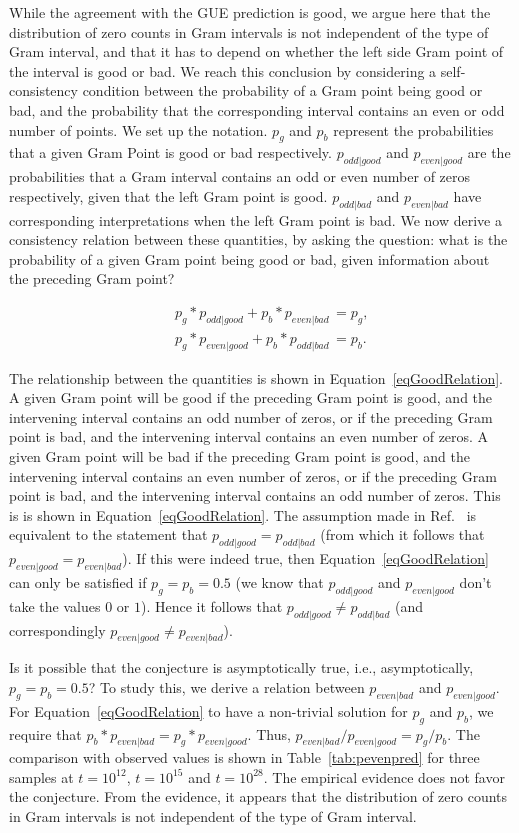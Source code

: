 \documentclass[twoside]{article}
\theoremstyle{definition}
\begin{document}
While the agreement with the GUE prediction is good, we argue here that the distribution of zero counts in Gram intervals is not independent of the type of Gram interval, and that it has to depend on whether the left side Gram point of the interval is good or bad. We reach this conclusion by considering a self-consistency condition between the probability of a Gram point being good or bad, and the probability that the corresponding interval contains an even or odd number of points.  We set up the notation. $p_g$ and $p_b$ represent the probabilities that a given Gram Point is good or bad respectively.  $p_{odd|good}$ and $p_{even|good}$ are the probabilities that a Gram interval contains an odd or even number of zeros respectively, given that the left Gram point is good. $p_{odd|bad}$ and $p_{even|bad}$ have corresponding interpretations when the left Gram point is bad. We now derive a consistency relation between these quantities, by asking the question: what is the probability of a given Gram point being good or bad, given information about the preceding Gram point? 

\begin{eqnarray}
&&p_g*p_{odd|good}  + p_b*p_{even|bad}\, =  p_g,\nonumber\\
&&p_g*p_{even|good} + p_b*p_{odd|bad}\, = p_b.
\label{eqGoodRelation}
\end{eqnarray}

The relationship between the quantities is shown in Equation~\ref{eqGoodRelation}. A given Gram point will be good if the preceding Gram point is good, and the intervening interval contains an odd number of zeros, or if the preceding Gram point is bad, and the intervening interval contains an even number of zeros. A given Gram point will be bad if the preceding Gram point is good, and the intervening interval contains an even number of zeros, or if the preceding Gram point is bad, and the intervening interval contains an odd number of zeros. This is is shown in Equation~\ref{eqGoodRelation}. The assumption made in Ref.~\cite{Odlyzko 1992} is equivalent to the statement that $p_{odd|good} = p_{odd|bad}$ (from which it follows that  $p_{even|good} = p_{even|bad}$). If this were indeed true, then Equation~\ref{eqGoodRelation} can only be satisfied if $p_g = p_b = 0.5$ (we know that $p_{odd|good}$ and $p_{even|good}$ don't take the values $0$ or $1$). Hence it follows that $p_{odd|good} \neq p_{odd|bad}$ (and correspondingly $p_{even|good} \neq p_{even|bad}$). 

Is it possible that the conjecture is asymptotically true, i.e., asymptotically, $p_g = p_b = 0.5$? To study this, we derive a relation between $p_{even|bad}$ and $p_{even|good}$. For Equation~\ref{eqGoodRelation} to have a non-trivial solution for $p_g$ and $p_b$, we require that $p_b*p_{even|bad} = p_g*p_{even|good}$. Thus, $p_{even|bad}/p_{even|good}= p_g/p_b$. The comparison with observed values is shown in Table~\ref{tab:pevenpred} for three samples at $t=10^{12}$, $t=10^{15}$  and $t=10^{28}$. The empirical evidence does not favor the conjecture. From the evidence, it appears that the distribution of zero counts in Gram intervals is not independent of the type of Gram interval. 
\end{document}
